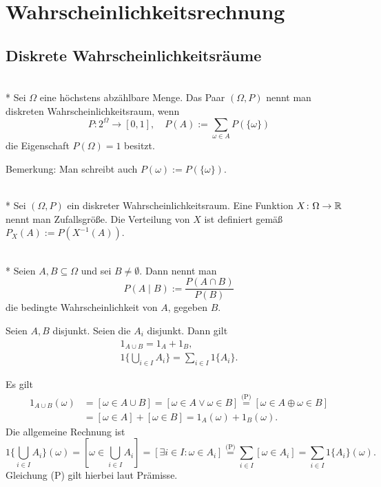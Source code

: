 
\chapter{Wahrscheinlichkeitsrechnung}

\section{Diskrete Wahrscheinlichkeitsräume}

\begin{Definition}%
\label{def:discrete-prob-space}\mbox{}\\*
Sei $\Omega$ eine höchstens abzählbare Menge. Das
Paar $(\Omega,P)$ nennt man diskreten Wahrscheinlichkeitsraum,
wenn
\[P\colon 2^\Omega\to [0,1],\quad P(A):=\sum_{\omega\in A} P(\{\omega\})\]
die Eigenschaft $P(\Omega) = 1$ besitzt.
\end{Definition}
Bemerkung: Man schreibt auch $P(\omega):=P(\{\omega\})$.

\begin{Definition}%
\mbox{}\\*
Sei $(\Omega,P)$ ein diskreter Wahrscheinlichkeitsraum.
Eine Funktion $X\colon\Omega\to\mathbb R$ nennt man Zufallsgröße.
Die Verteilung von $X$ ist definiert gemäß $P_X(A):=P(X^{-1}(A))$.
\end{Definition}

\begin{Definition}%
\mbox{}\\*
Seien $A,B\subseteq\Omega$ und sei $B\ne\emptyset$. Dann nennt man
\[P(A\mid B) := \frac{P(A\cap B)}{P(B)}\]
die bedingte Wahrscheinlichkeit von $A$, gegeben $B$.
\end{Definition}

\begin{Lemma}\label{indicator-disjoint}
Seien $A,B$ disjunkt. Seien die $A_i$ disjunkt. Dann gilt
\begin{gather*}
1_{A\cup B} = 1_A + 1_B,\\
1\{\bigcup_{i\in I} A_i\} = \sum_{i\in I} 1\{A_i\}.
\end{gather*}
\end{Lemma}
\begin{Beweis}
Es gilt
\begin{align*}
1_{A\cup B}(\omega) &= [\omega\in A\cup B]
= [\omega\in A\lor\omega\in B]
\stackrel{\text{(P)}}= [\omega\in A\oplus\omega\in B]\\
&= [\omega\in A] + [\omega\in B] = 1_A(\omega) + 1_B(\omega).
\end{align*}
Die allgemeine Rechnung ist
\[1\{\bigcup_{i\in I} A_i\}(\omega) = [\omega\in\bigcup_{i\in I} A_i]
= [\exists i\in I\colon \omega\in A_i]
\stackrel{\text{(P)}}= \sum_{i\in I} [\omega\in A_i]
= \sum_{i\in I} 1\{A_i\}(\omega).\]
Gleichung (P) gilt hierbei laut Prämisse.\,\qedsymbol
\end{Beweis}

